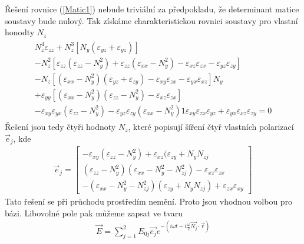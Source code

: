 Řešení rovnice (\ref{Matic1}) nebude triviální za předpokladu, že determinant matice soustavy bude nulový. 
Tak získáme charakteristickou rovnici soustavy pro vlastní honodty $N_z$ \cite{Visnovsky}
\begin{eqnarray}
\begin{split}
N_z^4\varepsilon_{zz}+N_z^3[N_y(\varepsilon_{yz}+\varepsilon_{yz})]\\
-N_z^2[\varepsilon_{zz}(\varepsilon_{zz}-N_y^2)+\varepsilon_{zz}(\varepsilon_{xx}-N_y^2)-\varepsilon_{xz}\varepsilon_{zx}-\varepsilon_{yz}\varepsilon_{zy}]\\
-N_z[(\varepsilon_{xx}-N_y^2)(\varepsilon_{yz}+\varepsilon_{zy})-\varepsilon_{xy}\varepsilon_{zx}-\varepsilon_{yx}\varepsilon_{xz}]N_y \\
+\varepsilon_{yy}[(\varepsilon_{xx}-N_y^2)(\varepsilon_{zz}-N_y^2)-\varepsilon_{xz}\varepsilon_{zx}]\\
-\varepsilon_{xy}\varepsilon_{yx}(\varepsilon_{zz}-N_y^2)-\varepsilon_{yz}\varepsilon_{zy}(\varepsilon_{xx}-N_y^2)1\varepsilon_{xy}\varepsilon_{zx}\varepsilon_{yz}+\varepsilon_{yx}\varepsilon_{xz}\varepsilon_{zy}=0
\end{split}
\end{eqnarray}
Řešení jsou tedy čtyři hodnoty $N_z$, které popisují šíření čtyř vlastních polarizací $\vec{e}_j$, kde
\begin{eqnarray}
\vec{e}_j=
\begin{bmatrix}
-\varepsilon_{xy}(\varepsilon_{zz}-N_y^2)+\varepsilon_{xz}(\varepsilon_{zy}+N_yN_{zj} \\
(\varepsilon_{zz}-N_y^2)(\varepsilon_{xx}-N_y^2-N^2_{zj})-\varepsilon_{xz}\varepsilon_{zx} \\
-(\varepsilon_{xx}-N_y^2-N^2_{zj})(\varepsilon_{zy}+N_yN_{zj})+\varepsilon_{zx}\varepsilon_{xy}
\end{bmatrix}
\end{eqnarray}
Tato řešení se při průchodu prostředím nemění. Proto jsou vhodnou volbou pro bázi. Libovolné pole pak můžeme zapsat ve tvaru
\begin{eqnarray}
\vec{E}=\sum_{j=1}^2E_{0j}\vec{e_j}e^{-(i\omega t-i\frac{\omega}{c}\vec{N_j}\cdot\vec{r})}
\label{Rozpis E}
\end{eqnarray}

